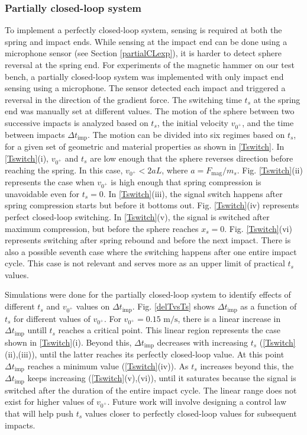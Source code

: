 \documentclass[letterpaper, 10 pt, conference]{ieeeconf}  %
\begin{document}
\subsubsection{Partially closed-loop system}
\label{pcl}

To implement a perfectly closed-loop system, sensing is required at both the spring and impact ends. While sensing at the impact end can be done using a microphone sensor (see Section \ref{partialCLexp}), it is harder to detect sphere reversal at the spring end. For experiments of the magnetic hammer on our test bench, a partially closed-loop system was implemented with only impact end sensing using a microphone. The sensor detected each impact and triggered a reversal in the direction of the gradient force. The switching time $t_s$ at the spring end was manually set at different values. The motion of the sphere between two successive impacts is analyzed based on $t_s$, the initial velocity $v_{0^+}$, and the time between impacts $\Delta t_{\textrm{imp}}$. The motion can be divided into six regimes based on $t_s$, for a given set of geometric and material properties as shown in \cref{Tswitch}. In \cref{Tswitch}(i), $v_{0^+}$ and $t_s$ are low enough that the sphere reverses direction before reaching the spring. In this case, $v_{0^+} < 2aL$, where $a=F_{\textrm{mag}}/m_s$. Fig. \ref{Tswitch}(ii) represents the case when $v_{0^+}$ is high enough that spring compression is unavoidable even for $t_s = 0$. In \cref{Tswitch}(iii), the signal switch happens after spring compression starts but before it bottoms out. Fig. \ref{Tswitch}(iv) represents perfect closed-loop switching. In \cref{Tswitch}(v), the signal is switched after maximum compression, but before the sphere reaches $x_s=0$. Fig. \ref{Tswitch}(vi) represents switching after spring rebound and before the next impact. There is also a possible seventh case where the switching happens after one entire impact cycle. This case is not relevant and serves more as an upper limit of practical $t_s$ values. 

Simulations were done for the partially closed-loop system to identify effects of different $t_s$ and $v_{0^+}$ values on $\Delta t_{\textrm{imp}}$. Fig. \ref{delTvsTs} shows $\Delta t_{\textrm{imp}}$ as a function of $t_s$ for different values of $v_{0^+}$. For $v_{0^+}=0.15\text{ m/s}$, there is a linear increase in $\Delta t_{\textrm{imp}}$ untill $t_s$ reaches a critical point. This linear region represents the case shown in \cref{Tswitch}(i). Beyond this, $\Delta t_{\textrm{imp}}$ decreases with increasing $t_s$ (\cref{Tswitch}(ii),(iii)), until the latter reaches its perfectly closed-loop value. At this point $\Delta t_{\textrm{imp}}$ reaches a minimum value (\cref{Tswitch}(iv)). As $t_s$ increases beyond this, the $\Delta t_{\textrm{imp}}$ keeps increasing (\cref{Tswitch}(v),(vi)), until it saturates because the signal is switched after the duration of the entire impact cycle. The linear range does not exist for higher values of $v_{0^+}$. Future work will involve designing a control law that will help push $t_s$ values closer to perfectly closed-loop values for subsequent impacts.
\end{document}
